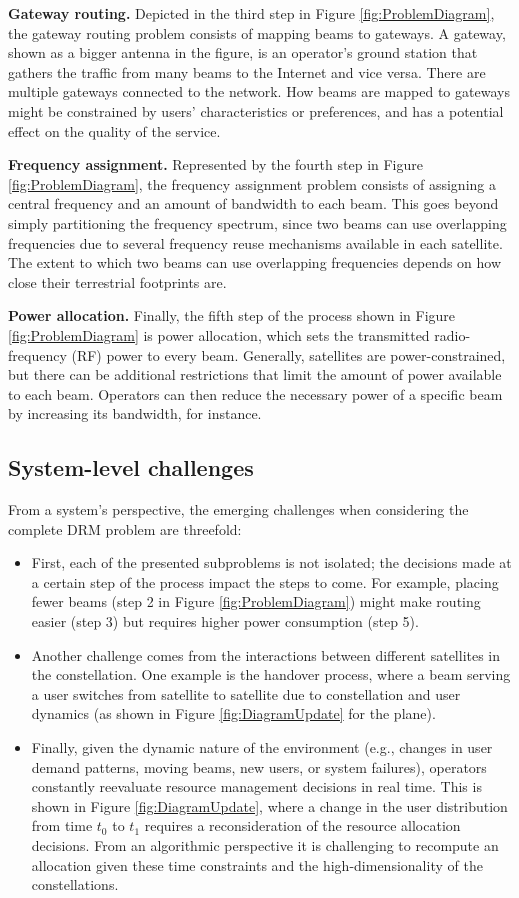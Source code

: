\documentclass[letterpaper]{article} %
\begin{document}
\textbf{Gateway routing.}
Depicted in the third step in Figure \ref{fig:ProblemDiagram}, the gateway routing problem consists of mapping beams to gateways. A gateway, shown as a bigger antenna in the figure, is an operator's ground station that gathers the traffic from many beams to the Internet and vice versa. There are multiple gateways connected to the network. How beams are mapped to gateways might be constrained by users' characteristics or preferences, and has a potential effect on the quality of the service.

\textbf{Frequency assignment.}
Represented by the fourth step in Figure \ref{fig:ProblemDiagram}, the frequency assignment problem consists of assigning a central frequency and an amount of bandwidth to each beam. This goes beyond simply partitioning the frequency spectrum, since two beams can use overlapping frequencies due to several frequency reuse mechanisms available in each satellite. The extent to which two beams can use overlapping frequencies depends on how close their terrestrial footprints are.

\textbf{Power allocation.}
Finally, the fifth step of the process shown in Figure \ref{fig:ProblemDiagram} is power allocation, which sets the transmitted radio-frequency (RF) power to every beam. Generally, satellites are power-constrained, but there can be additional restrictions that limit the amount of power available to each beam. Operators can then reduce the necessary power of a specific beam by increasing its bandwidth, for instance.


\subsection{System-level challenges}
\label{sec:2.3}
From a system's perspective, the emerging challenges when considering the complete DRM problem are threefold:
\begin{itemize}
\item First, each of the presented subproblems is not isolated; the decisions made at a certain step of the process impact the steps to come. For example, placing fewer beams (step 2 in Figure \ref{fig:ProblemDiagram}) might make routing easier (step 3) but requires higher power consumption (step 5).
\item Another challenge comes from the interactions between different satellites in the constellation. One example is the handover process, where a beam serving a user switches from satellite to satellite due to constellation and user dynamics (as shown in Figure \ref{fig:DiagramUpdate} for the plane).
\item Finally, given the dynamic nature of the environment (e.g., changes in user demand patterns, moving beams, new users, or system failures), operators constantly reevaluate resource management decisions in real time. This is shown in Figure \ref{fig:DiagramUpdate}, where a change in the user distribution from time $t_0$ to $t_1$ requires a reconsideration of the resource allocation decisions. From an algorithmic perspective it is challenging to recompute an allocation given these time constraints and the high-dimensionality of the constellations.
\end{itemize}
\end{document}
